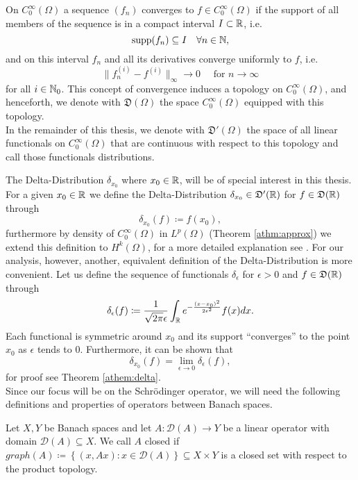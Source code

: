 \begin{definition}[Distributions]
	On $C_{0}^{\infty}(\Omega)$ a sequence $(f_{n})$ converges to $f \in C_{0}^{\infty}(\Omega)$ if the support of all members of the sequence is in a compact interval $I \subset \mathbb{R}$, i.e.
	$$ \operatorname{supp} (f_{n}) \subseteq I \quad \forall n \in \mathbb{N}, $$
	and on this interval $f_{n}$ and all its derivatives converge uniformly to $f$, i.e.
	\[ \| f_{n}^{(i)} - f^{(i)} \|_{\infty} \rightarrow 0 \quad \text{ for } n \rightarrow \infty \]
	for all $i \in \mathbb{N}_{0}$. This concept of convergence induces a topology on $C_{0}^{\infty}(\Omega)$, and henceforth, we denote with $\mathfrak{D}(\Omega)$ the space $C_{0}^{\infty}(\Omega)$ equipped with this topology.
~\\

	In the remainder of this thesis, we denote with $\mathfrak{D}'(\Omega)$ the space of all linear functionals on $C_{0}^{\infty}(\Omega)$ that are continuous with respect to this topology and call those functionals distributions.  
\end{definition}

The Delta-Distribution $\delta_{x_{0}}$ where $x_{0} \in \mathbb{R}$, will be of special interest in this thesis. For a given $x_{0} \in \mathbb{R}$ we define the Delta-Distribution $\delta_{x_{0}} \in \mathfrak{D}'(\mathbb{R})$ for $f \in \mathfrak{D}(\mathbb{R})$ through
		\[  \delta_{x_{0}}(f) \coloneqq f(x_{0}), \]
	furthermore by density of $C_{0}^{\infty}(\Omega)$ in $L^{p}(\Omega)$ (Theorem \ref{athm:approx}) we extend this definition to $H^{k}(\Omega)$, for a more detailed explanation see \cite[p. 429]{werner2006funkana}. For our analysis, however, another, equivalent definition of the Delta-Distribution is more convenient. Let us define the sequence of functionals $\delta_{\epsilon}$ for $\epsilon > 0$ and $f \in \mathfrak{D}(\mathbb{R})$ through
	\begin{equation}
		\delta_{\epsilon}(f) \coloneqq \frac{1}{\sqrt{2 \pi} \epsilon} \int_{\mathbb{R}} e^{-\frac{(x - x_{0})^{2}}{2 \epsilon^{2}}} f(x) dx. \label{eq:2.1-smooth_potential}
	\end{equation}
 	Each functional is symmetric around $x_{0}$ and its support \enquote{converges} to the point $x_{0}$ as $\epsilon$ tends to $0$. Furthermore, it can be shown that
 	\[ \delta_{x_{0}}(f) = \lim_{\epsilon \rightarrow 0} \delta_{\epsilon}(f), \]
 	for proof see Theorem \ref{athem:delta}.
~\\

Since our focus will be on the Schrödinger operator, we will need the following definitions and properties of operators between Banach spaces.
\begin{definition} 
Let $X, Y$ be Banach spaces and let $A \colon \mathcal{D}(A) \rightarrow Y$ be a linear operator with domain $\mathcal{D}(A) \subseteq X$. We call $A$ closed if $graph(A) \coloneqq \left\{ (x, Ax) : x \in \mathcal{D}(A) \right\} \subseteq X \times Y$ is a closed set with respect to the product topology.
\end{definition}

